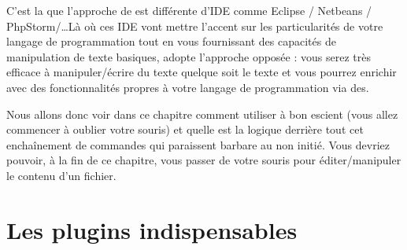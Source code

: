 C'est la que l'approche de \vim est différente d'IDE comme Eclipse / Netbeans / PhpStorm/\ldots Là où ces IDE vont mettre l'accent sur les particularités de votre langage de programmation tout en vous fournissant des capacités de manipulation de texte basiques, \vim adopte l'approche opposée : vous serez très efficace à manipuler/écrire du texte quelque soit le texte et vous pourrez enrichir \vim avec des fonctionnalités propres à votre langage de programmation via des.

Nous allons donc voir dans ce chapitre comment utiliser \vim à bon escient (vous allez commencer à oublier votre souris) et quelle est la logique derrière tout cet enchaînement de commandes qui paraissent barbare au non initié. Vous devriez pouvoir, à la fin de ce chapitre, vous passer de votre souris pour éditer/manipuler le contenu d'un fichier.

\chapter{Les plugins indispensables}

\printindex


